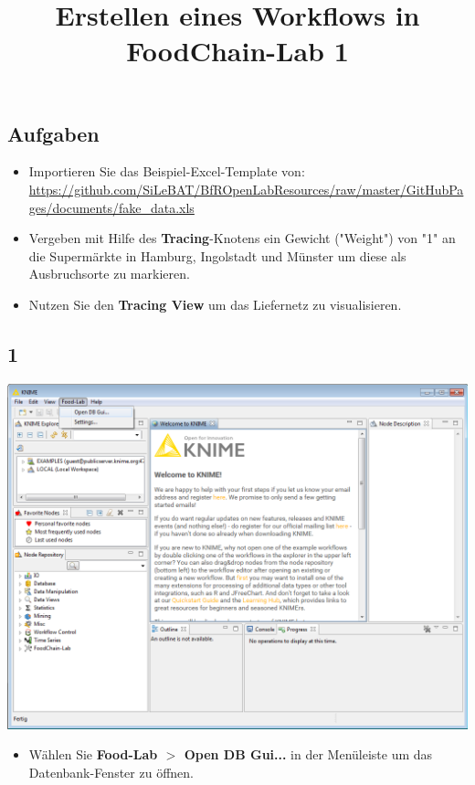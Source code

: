 \documentclass{beamer}
\title{Erstellen eines Workflows in FoodChain-Lab 1}
\date{}
\begin{document}
\maketitle

\section{ }

\subsection{Aufgaben}
\begin{frame}
	\begin{itemize}
		\item Importieren Sie das Beispiel-Excel-Template von: \url{https://github.com/SiLeBAT/BfROpenLabResources/raw/master/GitHubPages/documents/fake_data.xls}
		\item Vergeben mit Hilfe des \textbf{Tracing}-Knotens ein Gewicht ("Weight") von "1" an die Supermärkte in Hamburg, Ingolstadt und Münster um diese als Ausbruchsorte zu markieren.
		\item Nutzen Sie den \textbf{Tracing View} um das Liefernetz zu visualisieren.
	\end{itemize}
\end{frame}
 
\subsection{1}
\begin{frame}
	\begin{center}
  		\includegraphics[height=0.6\textheight]{1.png}
	\end{center}
	\begin{itemize}
		\item Wählen Sie \textbf{Food-Lab $>$ Open DB Gui...} in der Menüleiste um das Datenbank-Fenster zu öffnen.
	\end{itemize}
\end{frame}
\end{document}
